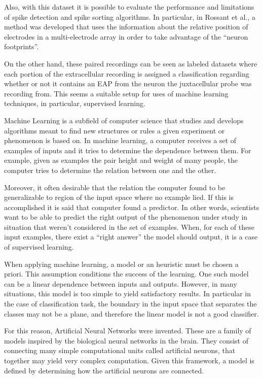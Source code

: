 Also, with this dataset it is possible to evaluate the performance and limitations of spike detection and spike sorting algorithms. In particular, in Rossant et al., a method was developed that uses the information about the relative position of electrodes in a multi-electrode array in order to take advantage of the “neuron footprints”.

On the other hand, these paired recordings can be seen as labeled datasets where each portion of the extracellular recording is assigned a classification regarding whether or not it contains an EAP from the neuron the juxtacellular probe was recording from. This seems a suitable setup for uses of machine learning techniques, in particular, supervised learning.

Machine Learning is a subfield of computer science that studies and develops algorithms meant to find new structures or rules a given experiment or phenomenon is based on. In machine learning, a computer receives a set of examples of inputs and it tries to determine the dependence between them. For example, given as examples the pair height and weight of many people, the computer tries to determine the relation between one and the other. 
 
Moreover, it often desirable that the relation the computer found to be generalizable to region of the input space where no example lied. If this is accomplished it is said that computer found a predictor. In other words, scientists want to be able to predict the right output of the phenomenon under study in situation that weren't considered in the set of examples. 
When, for each of these input examples, there exist a “right answer” the model should output, it is a case of supervised learning.

When applying machine learning, a model or an heuristic must be chosen a priori. This assumption conditions the success of the learning. One such model can be a linear dependence between inputs and outputs. However, in many situations, this model is too simple to yield satisfactory results. In particular in the case of classification task, the boundary in the input space that separates the  classes may not be a plane, and therefore the linear model is not a good classifier.

For this reason, Artificial Neural Networks were invented. These are a family of models inspired by the biological neural networks in the brain. They consist of connecting many simple computational units called artificial neurons, that together may yield very complex computation. Given this framework, a model is defined by determining how the artificial neurons are connected. 

